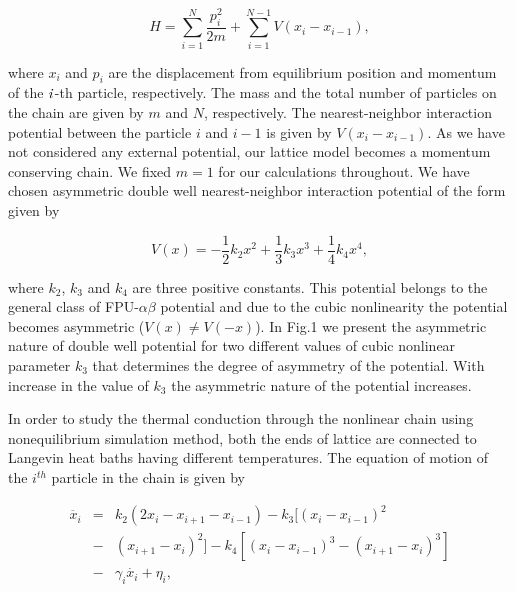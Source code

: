 \documentclass[aps,pre,reprint,groupedaddress]{revtex4-1}
\begin{document}
\begin{equation}
H=\sum_{i=1}^{N}\frac{p_i^2}{2m}+\sum_{i=1}^{N-1}V(x_i-x_{i-1}),
\label{eq1}
\end{equation}

where $x_i$ and $p_i$ are the displacement from equilibrium position and momentum of the $\it{i}$-th particle, respectively. The mass and the total number of particles on the chain are given by $m$ and $N$, respectively. The nearest-neighbor interaction potential between the particle $i$ and $i-1$ is given by $V(x_i-x_{i-1})$. As we have not considered any external potential, our lattice model becomes a momentum conserving chain. We fixed $m=1$ for our calculations throughout. We have chosen asymmetric double well nearest-neighbor interaction potential of the form given by

\begin{equation}
V(x)=-\frac{1}{2}k_2x^2+\frac{1}{3}k_3x^3+\frac{1}{4}k_4x^4,
\label{eq2}
\end{equation}
 
where $k_2$, $k_3$ and $k_4$ are three positive constants. This potential  belongs to the general class of FPU-$\alpha\beta$ potential and due to the cubic nonlinearity the potential becomes asymmetric ($V(x)\neq V(-x)$). In Fig.1 we present the asymmetric nature of double well potential for two different values of cubic nonlinear parameter $k_3$ that determines the degree of asymmetry of the potential. With increase in the value of $k_3$ the asymmetric nature of the potential increases.


In order to study the thermal conduction through the nonlinear chain using nonequilibrium simulation method, both the ends of lattice are connected to Langevin heat baths having different temperatures. The equation of motion of the $i^{th}$ particle in the chain is given by

\begin{eqnarray}
\ddot{x_i} & = & k_2(2x_i-x_{i+1}-x_{i-1})-k_3[(x_i-x_{i-1})^2\nonumber \\
& - &(x_{i+1}-x_i)^2]- k_4[(x_i-x_{i-1})^3-(x_{i+1}-x_i)^3] \nonumber \\
& - &\gamma_i\dot{x_i}+\eta_i ,
\label{eq3}
\end{eqnarray}
\end{document}
